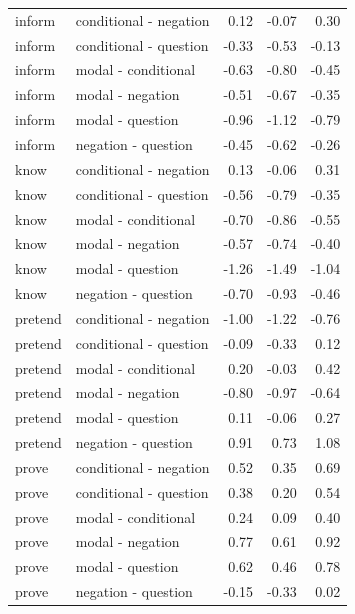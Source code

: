 \documentclass[a4paper,12pt,twoside]{article}
\begin{document}
\begin{longtable}{llrrr}
      inform & conditional - negation & 0.12 & -0.07 & 0.30 \\ 
      inform & conditional - question & -0.33 & -0.53 & -0.13 \\ 
      inform & modal - conditional & -0.63 & -0.80 & -0.45 \\ 
      inform & modal - negation & -0.51 & -0.67 & -0.35 \\ 
      inform & modal - question & -0.96 & -1.12 & -0.79 \\ 
      inform & negation - question & -0.45 & -0.62 & -0.26 \\ \midrule

      know & conditional - negation & 0.13 & -0.06 & 0.31 \\ 
      know & conditional - question & -0.56 & -0.79 & -0.35 \\ 
      know & modal - conditional & -0.70 & -0.86 & -0.55 \\ 
      know & modal - negation & -0.57 & -0.74 & -0.40 \\ 
      know & modal - question & -1.26 & -1.49 & -1.04 \\ 
      know & negation - question & -0.70 & -0.93 & -0.46 \\ \midrule

      pretend & conditional - negation & -1.00 & -1.22 & -0.76 \\ 
      pretend & conditional - question & -0.09 & -0.33 & 0.12 \\ 
      pretend & modal - conditional & 0.20 & -0.03 & 0.42 \\ 
      pretend & modal - negation & -0.80 & -0.97 & -0.64 \\ 
      pretend & modal - question & 0.11 & -0.06 & 0.27 \\ 
      pretend & negation - question & 0.91 & 0.73 & 1.08 \\ \midrule

      prove & conditional - negation & 0.52 & 0.35 & 0.69 \\ 
      prove & conditional - question & 0.38 & 0.20 & 0.54 \\ 
      prove & modal - conditional & 0.24 & 0.09 & 0.40 \\ 
      prove & modal - negation & 0.77 & 0.61 & 0.92 \\ 
      prove & modal - question & 0.62 & 0.46 & 0.78 \\ 
      prove & negation - question & -0.15 & -0.33 & 0.02 \\ \midrule


\end{longtable}
\end{document}
